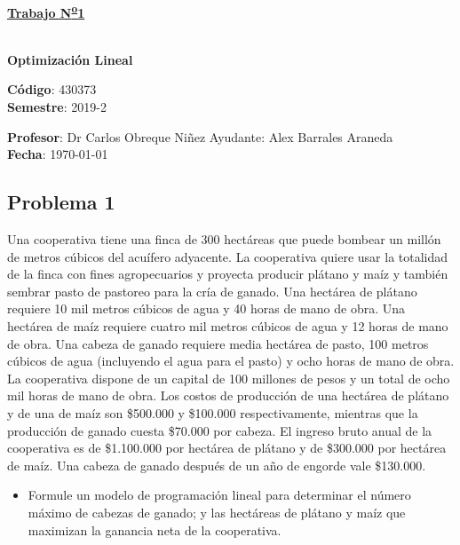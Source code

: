 \documentclass[letterpaper]{article}
\begin{document}
\vspace*{0.5\baselineskip}
\begin{center}
\begin{Large}
\textbf{\underline{Trabajo N\textsuperscript{\underline{o}}1}}
\end{Large}\\
\vspace*{0.5\baselineskip}
\textbf{Optimización Lineal} \\
\vspace*{0.5\baselineskip}
\begin{footnotesize}
\textbf{Código}: 430373\\
\textbf{Semestre}: 2019-2
\end{footnotesize}
\end{center}

\noindent \textbf{Profesor}: Dr Carlos Obreque Niñez  \hfill Ayudante: Alex Barrales Araneda\\
\noindent \textbf{Fecha}: \today

\subsection*{Problema 1}
Una cooperativa tiene una finca de 300 hectáreas que puede bombear un millón de metros cúbicos del acuífero adyacente. La cooperativa quiere usar la totalidad de la finca con fines agropecuarios y proyecta producir plátano y maíz y también sembrar pasto de pastoreo para la cría de ganado. Una hectárea de plátano requiere 10 mil metros cúbicos de agua y 40 horas de mano de obra. Una hectárea de maíz requiere cuatro mil metros cúbicos de agua y 12 horas de mano de obra. Una cabeza de ganado requiere media hectárea de pasto, 100 metros cúbicos de agua (incluyendo el agua para el pasto) y ocho horas de mano de obra. La cooperativa dispone de un capital de 100 millones de pesos y un total de ocho mil horas de mano de obra. Los costos de producción de una hectárea de plátano y de una de maíz son \$500.000 y \$100.000 respectivamente, mientras que la producción de ganado cuesta \$70.000 por cabeza. El ingreso bruto anual de la cooperativa es de \$1.100.000 por hectárea de plátano y de \$300.000 por hectárea de maíz. Una cabeza de ganado después de un año de engorde vale \$130.000.
\begin{itemize}
\item Formule un modelo de programación lineal para determinar el número máximo de cabezas de ganado; y las hectáreas de plátano y maíz que maximizan la ganancia neta de la cooperativa.
\end{itemize}
\end{document}
